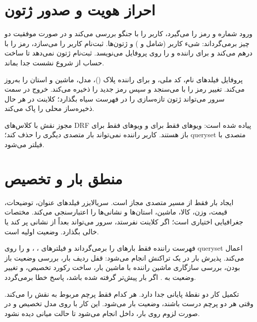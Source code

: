 \section{احراز هویت و صدور ژتون}

ورود  شماره و رمز را می‌گیرد، کاربر را با  جنگو بررسی می‌کند و در صورت موفقیت دو چیز برمی‌گرداند: شیء کاربر (شامل  و ) و ژتون‌ها. ثبت‌نام  کاربر را می‌سازد، رمز را با  درهم می‌کند و برای راننده  و  را روی پروفایل می‌نویسد. ثبت‌نام ژتون نمی‌دهد تا ساخت حساب از شروع نشست جدا بماند.

پروفایل  فیلدهای نام، کد ملی، و برای راننده پلاک ()، مدل، ماشین و استان را به‌روز می‌کند. تغییر رمز  را با  می‌سنجد و سپس رمز جدید را ذخیره می‌کند. خروج در سمت سرور می‌تواند ژتون تازه‌سازی را در فهرست سیاه بگذارد؛ کلاینت در هر حال ذخیره‌ساز محلی را پاک می‌کند.

مجوز نقش با کلاس‌های \textenglish{DRF} پیاده شده است: ویوهای  فقط برای  و ویوهای  فقط برای  باز هستند. کاربر راننده نمی‌تواند بار متصدی دیگری را حذف کند؛ queryset متصدی با  فیلتر می‌شود.

\section{منطق بار و تخصیص}

ایجاد بار فقط از مسیر متصدی مجاز است. سریالایزر فیلدهای عنوان، توضیحات، قیمت، وزن، کالا، ماشین، استان‌ها و نشانی‌ها را اعتبارسنجی می‌کند. مختصات جغرافیایی اختیاری است؛ اگر کلاینت نفرستد، سرور می‌تواند بعداً از نشانی پر کند یا خالی بگذارد. وضعیت اولیه  است.

فهرست راننده فقط بارهای  را برمی‌گرداند و فیلترهای ، ،  و  را روی queryset اعمال می‌کند. پذیرش بار در یک تراکنش انجام می‌شود: قفل ردیف بار، بررسی وضعیت باز بودن، بررسی سازگاری ماشین راننده با ماشین بار، ساخت رکورد تخصیص، و تغییر وضعیت به . اگر بار پیش‌تر گرفته شده باشد، پاسخ خطا برمی‌گردد.

تکمیل کار دو نقطهٔ پایانی جدا دارد. هر کدام فقط پرچم مربوط به نقش را  می‌کند. وقتی هر دو پرچم درست باشند، وضعیت بار  می‌شود. این کار با  روی مدل تخصیص و در صورت لزوم  روی بار، داخل  انجام می‌شود تا حالت میانی دیده نشود.

